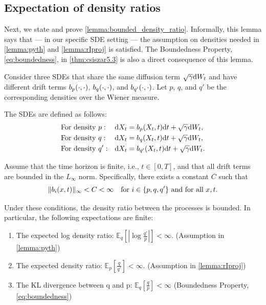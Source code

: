 \subsection{Expectation of density ratios}

Next, we state and prove \cref{lemma:bounded_density_ratio}. Informally, this lemma says that --- in our specific SDE setting --- the assumption on densities needed in \cref{lemma:pyth} and \cref{lemma:rIproj} is satisfied. The Boundedness Property, \cref{eq:boundedness}, in \cref{thm:csiszar5.3} is also a direct consequence of this lemma.

\begin{myLemma}
\label{lemma:bounded_density_ratio}

Consider three SDEs that share the same diffusion term \(\sqrt{\volatility}\de\brownianm\) and have different drift terms \(\drift_{p}(\cdot,\cdot)\), \(\drift_{q}(\cdot,\cdot)\), and \(\drift_{q'}(\cdot,\cdot)\). Let \(p\), \(q\), and \(q'\) be the corresponding densities over the Wiener measure.

The SDEs are defined as follows:
\[
\begin{aligned}
    &\text{For density } p: &&\de\responseat{\timet} = \drift_{p}(\responseat{\timet},t)\de t + \sqrt{\volatility}\de\brownianm, \\
    &\text{For density } q: &&\de\responseat{\timet} = \drift_{q}(\responseat{\timet},t)\de t + \sqrt{\volatility}\de\brownianm, \\
    &\text{For density } q': &&\de\responseat{\timet} = \drift_{q'}(\responseat{\timet},t)\de t + \sqrt{\volatility}\de\brownianm.
\end{aligned}
\]

Assume that the time horizon is finite, i.e., \(t \in [0, T]\), and that all drift terms are bounded in the \(L_\infty\) norm. Specifically, there exists a constant \(C\) such that
\[
\|\drift_{i}(x,t)\|_{\infty} < C < \infty \quad \text{for } i \in \{p, q, q'\} \text{ and for all } x, t.
\]

Under these conditions, the density ratio between the processes is bounded. In particular, the following expectations are finite:
\begin{enumerate}
    \item The expected log density ratio: \(\mathbb{E}_{q} \left[ \left| \log \frac{q'}{p} \right| \right] < \infty\). (Assumption in \cref{lemma:pyth})
    \item The expected density ratio: \(\mathbb{E}_{p} \left[ \frac{q}{q'} \right] < \infty\). (Assumption in \cref{lemma:rIproj})
    \item The KL divergence between q and p: \(\mathbb{E}_{q} \left[ \frac{q}{p} \right] < \infty\) (Boundedness Property, \cref{eq:boundedness})
\end{enumerate}
\end{myLemma}

